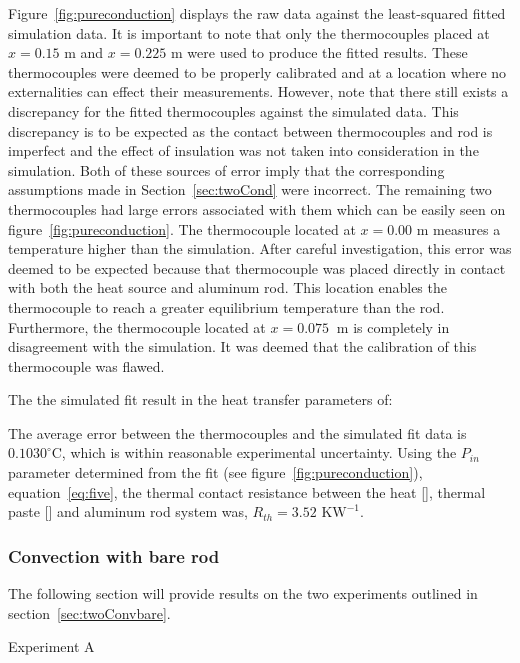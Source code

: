 \documentclass[10pt,aps,prb,twocolumn, nofootinbib]{revtex4-1}
\begin{document}
Figure~\ref{fig:pureconduction} displays the raw data against the least-squared fitted simulation data. It is important to note that only the thermocouples placed at $x = 0.15$ m and $x = 0.225$ m were used to produce the fitted results. These thermocouples were deemed to be properly calibrated and at a location where no externalities can effect their measurements. However, note that there still exists a discrepancy for the fitted thermocouples against the simulated data. This discrepancy is to be expected as the contact between thermocouples and rod is imperfect and the effect of insulation was not taken into consideration in the simulation. Both of these sources of error imply that the corresponding assumptions made in Section~\ref{sec:twoCond} were incorrect. The remaining two thermocouples had large errors associated with them which can be easily seen on figure~\ref{fig:pureconduction}. The thermocouple located at $x = 0.00$ m measures a temperature higher than the simulation. After careful investigation, this error was deemed to be expected because that thermocouple was placed directly in contact with both the heat source and aluminum rod. This location enables the thermocouple to reach a greater equilibrium temperature than the rod. Furthermore, the thermocouple located at $x = 0.075~\text{ m}$ is completely in disagreement with the simulation. It was deemed that the calibration of this thermocouple was flawed.

 The the simulated fit result in the heat transfer parameters of:
 \begin{center}
 \end{center}
 The average error between the thermocouples and the simulated fit data is $0.1030 ^\circ$C, which is within reasonable experimental uncertainty. Using the $P_{in}$ parameter determined from the fit (see figure~\ref{fig:pureconduction}), equation~\ref{eq:five}, the thermal contact resistance between the heat  [], thermal paste [] and aluminum rod system was, $\boxed{R_{th} = 3.52 \text{ K}\text{W}^{-1}}$.

\subsubsection{\label{threeConv} Convection with bare rod}
The following section will provide results on the two experiments outlined in section~\ref{sec:twoConvbare}.
\newpage
\begin{description}
\item[Experiment A]
\end{description}
\end{document}
